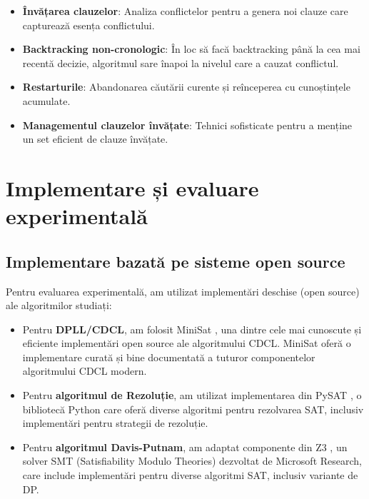 \documentclass[a4paper,10pt]{article}
\begin{document}
\begin{itemize}
    \item \textbf{Învățarea clauzelor}: Analiza conflictelor pentru a genera noi clauze care capturează esența conflictului.
    
    \item \textbf{Backtracking non-cronologic}: În loc să facă backtracking până la cea mai recentă decizie, algoritmul sare înapoi la nivelul care a cauzat conflictul.
    
    \item \textbf{Restarturile}: Abandonarea căutării curente și reînceperea cu cunoștințele acumulate.
    
    \item \textbf{Managementul clauzelor învățate}: Tehnici sofisticate pentru a menține un set eficient de clauze învățate.
\end{itemize}

\section{Implementare și evaluare experimentală}

\subsection{Implementare bazată pe sisteme open source}

Pentru evaluarea experimentală, am utilizat implementări deschise (open source) ale algoritmilor studiați:

\begin{itemize}
    \item Pentru \textbf{DPLL/CDCL}, am folosit MiniSat \cite{Minisat}, una dintre cele mai cunoscute și eficiente implementări open source ale algoritmului CDCL. MiniSat oferă o implementare curată și bine documentată a tuturor componentelor algoritmului CDCL modern.
    
    \item Pentru \textbf{algoritmul de Rezoluție}, am utilizat implementarea din PySAT \cite{PySAT}, o bibliotecă Python care oferă diverse algoritmi pentru rezolvarea SAT, inclusiv implementări pentru strategii de rezoluție.
    
    \item Pentru \textbf{algoritmul Davis-Putnam}, am adaptat componente din Z3 \cite{Z3}, un solver SMT (Satisfiability Modulo Theories) dezvoltat de Microsoft Research, care include implementări pentru diverse algoritmi SAT, inclusiv variante de DP.
\end{itemize}
\end{document}
